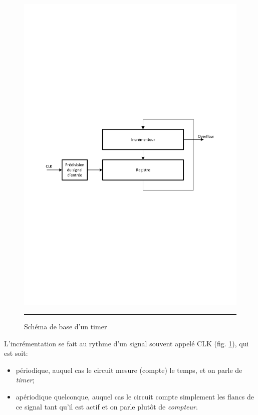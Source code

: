 \begin{figure}[htb]
  \centering
  \includegraphics[angle=0, width=14cm]{./Figures/Chap5_Timer/Timer.pdf}
  \rule{35em}{0.5pt}
  \caption[Schéma Timer]{Schéma de base d'un timer}
  \label{fig:Timer}
\end{figure}

L'incrémentation se fait au rythme d'un signal souvent appelé CLK (fig. \ref{fig:Timer}), qui est soit:
\begin{itemize}[label=\textbullet,font=\small]
\item périodique, auquel cas le circuit mesure (compte) le temps, et on parle de \textit{timer};
\item apériodique quelconque, auquel cas le circuit compte simplement les flancs de ce signal tant qu'il est actif et on parle plutôt de \textit{compteur}.
\end{itemize}

